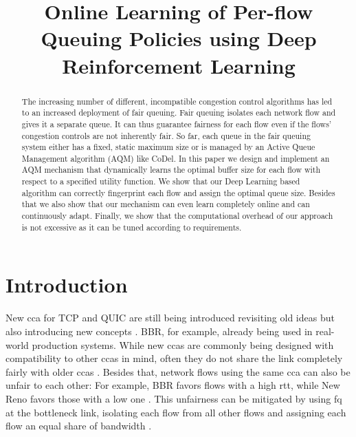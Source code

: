 \documentclass[conference]{IEEEtran}
\begin{document}
\title{Online Learning of Per-flow Queuing Policies using Deep Reinforcement Learning}

\author{
}

\maketitle

\begin{abstract}
The increasing number of different, incompatible congestion control algorithms has led to an increased deployment of fair queuing. Fair queuing isolates each network flow and gives it a separate queue. It can thus guarantee fairness for each flow even if the flows' congestion controls are not inherently fair. So far, each queue in the fair queuing system either has a fixed, static maximum size or is managed by an Active Queue Management algorithm (AQM) like CoDel. In this paper we design and implement an AQM mechanism that dynamically learns the optimal buffer size for each flow with respect to a specified utility function. We show that our Deep Learning based algorithm can correctly fingerprint each flow and assign the optimal queue size. Besides that we also show that our mechanism can even learn completely online and can continuously adapt. Finally, we show that the computational overhead of our approach is not excessive as it can be tuned according to requirements. 
\end{abstract}

\section{Introduction}

New \gls{cca} for TCP and QUIC are still being introduced revisiting old ideas but also introducing new concepts \cite{dong_pcc_2018, cardwell_bbr:_2016, hock_tcp_2017, bachl_cocoa_2019, jay_deep_2019}. BBR, for example, already being used in real-world production systems. While new \glspl{cca} are commonly being designed with compatibility to other \glspl{cca} in mind, often they do not share the link completely fairly with older \glspl{cca} \cite{hock_experimental_2017}. Besides that, network flows using the same \gls{cca} can also be unfair to each other: For example, BBR favors flows with a high \gls{rtt}, while New Reno favors those with a low one \cite{turkovic_interactions_2019,turkovic_fifty_2019}. This unfairness can be mitigated by using \gls{fq} at the bottleneck link, isolating each flow from all other flows and assigning each flow an equal share of bandwidth \cite{dumazet_pkt_sched:_2013}. 
\end{document}
